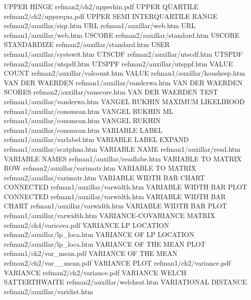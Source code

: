 UPPER HINGE                             refman2/ch2/upperhin.pdf
UPPER QUARTILE                          refman2/ch2/upperqua.pdf
UPPER SEMI INTERQUARTILE RANGE          refman2/auxillar/siqr.htm
URL                                     refman1/auxillar/web.htm
URL                                     refman1/auxillar/web.htm
USCORE                                  refman2/auxillar/standard.htm
USCORE STANDARDIZE                      refman2/auxillar/standard.htm
USER                                    refman1/auxillar/systswit.htm
UTSCDF                                  refman2/auxillar/utscdf.htm
UTSPDF                                  refman2/auxillar/utspdf.htm
UTSPPF                                  refman2/auxillar/utsppf.htm
VALUE COUNT                             refman2/auxillar/valcount.htm
VALUE                                   refman1/auxillar/houskeep.htm
VAN DER WAERDEN                         refman1/auxillar/vanderwa.htm
VAN DER WAERDEN SCORES                  refman2/auxillar/vanscore.htm
VAN DER WAERDEN TEST                    refman1/auxillar/vanderwa.htm
VANGEL RUKHIN MAXIMUM LIKELIHOOD        refman1/auxillar/consmean.htm
VANGEL RUKHIN ML                        refman1/auxillar/consmean.htm
VANGEL RUKHIN                           refman1/auxillar/consmean.htm
VARIABLE LABEL                          refman1/auxillar/varlabel.htm
VARIABLE LABEL EXPAND                   refman1/auxillar/scatplma.htm
VARIABLE NAME                           refman1/auxillar/read.htm
VARIABLE NAMES                          refman1/auxillar/readlabe.htm
VARIABLE TO MATRIX ROW                  refman2/auxillar/varimatr.htm
VARIABLE TO MATRIX                      refman2/auxillar/varimatr.htm
VARIABLE WIDTH BAR CHART CONNECTED      refman1/auxillar/varwidth.htm
VARIABLE WIDTH BAR PLOT CONNECTED       refman1/auxillar/varwidth.htm
VARIABLE WIDTH BAR CHART                refman1/auxillar/varwidth.htm
VARIABLE WIDTH BAR PLOT                 refman1/auxillar/varwidth.htm
VARIANCE-COVARIANCE MATRIX              refman2/ch4/varicova.pdf
VARIANCE LP LOCATION                    refman2/auxillar/lp_loca.htm
VARIANCE OF LP LOCATION                 refman2/auxillar/lp_loca.htm
VARIANCE OF THE MEAN PLOT               refman1/ch2/var_mean.pdf
VARIANCE OF THE MEAN                    refman2/ch2/var__mean.pdf
VARIANCE PLOT                           refman1/ch2/variance.pdf
VARIANCE                                refman2/ch2/variance.pdf
VARIANCE WELCH SATTERTHWAITE            refman2/auxillar/welchsat.htm
VARIATIONAL DISTANCE                    refman2/auxillar/varidist.htm

